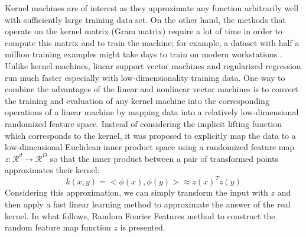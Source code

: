 Kernel machines are of interest as they approximate any function arbitrarily well with sufficiently large training data set. On the other hand, the methods that operate on the kernel matrix (Gram matrix) require a lot of time in order to compute this matrix and to train the machine; for example, a dataset with half a million training examples might take days to train on modern workstations \citep{rahimi2008random}.
Unlike kernel machines, linear support vector machines and regularized regression run much faster especially with low-dimensionality training data. 
One way to combine the advantages of the linear and nonlinear vector machines is to convert the training and evaluation of any kernel machine into the corresponding operations of a linear machine by mapping data into a relatively low-dimensional randomized feature space.
Instead of considering the implicit lifting function which corresponds to the kernel, it was proposed to explicitly map the data to a low-dimensional Euclidean inner product space using a randomized feature map $z:\mathcal{R}^d \xrightarrow{}\mathcal{R}^D$ so that the inner product between a pair of transformed points approximates their kernel:
\begin{equation}
k(x,y)=<\phi(x),\phi(y)> \approx z(x)^Tz(y)
\end{equation}
Considering this approximation, we can simply transform the input with $z$ and then apply a fast linear learning method to approximate the answer of the real kernel. \newline
In what follows, Random Fourier Features method to construct the random feature map function $z$ is presented.



